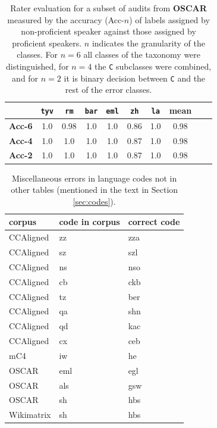 \begin{table}[!htbp]
    \centering
        \begin{tabular}{lccccccccc}
            \toprule
                           & \texttt{tyv} & \texttt{rm} & \texttt{bar} & \texttt{eml} & \texttt{zh} & \texttt{la} & \textbf{mean} \\
            \midrule
            \textbf{Acc-6} & 1.0          & 0.98        & 1.0          & 1.0          & 0.86        & 1.0         & 0.98          \\
            \textbf{Acc-4} & 1.0          & 1.0         & 1.0          & 1.0          & 0.87        & 1.0         & 0.98          \\
            \textbf{Acc-2} & 1.0          & 1.0         & 1.0          & 1.0          & 0.87        & 1.0         & 0.98          \\
            \bottomrule
        \end{tabular}%
    \caption{Rater evaluation for a subset of audits from \textbf{OSCAR} measured by the accuracy (Acc-$n$) of labels assigned by non-proficient speaker against those assigned by proficient speakers.  $n$ indicates the granularity of the classes. For $n=6$ all classes of the taxonomy were distinguished, for $n=4$ the \texttt{C} subclasses were combined, and for $n=2$ it is binary decision between \texttt{C} and the rest of the error classes.}
    \label{tab:agreement_oscar}
\end{table}


\begin{table}[!ht]
    \small
    \centering
    \begin{tabular}{lll}
        \toprule
        corpus     & code in corpus & correct code \\
        \hline
        CCAligned  & zz             & zza          \\
        CCAligned  & sz             & szl          \\
        CCAligned  & ns             & nso          \\
        CCAligned  & cb             & ckb          \\
        CCAligned  & tz             & ber          \\
        CCAligned  & qa             & shn          \\
        CCAligned  & qd             & kac          \\
        CCAligned  & cx             & ceb          \\
        mC4        & iw             & he           \\
        OSCAR      & eml            & egl          \\
        OSCAR      & als            & gsw          \\
        OSCAR      & sh             & hbs          \\
        Wikimatrix & sh             & hbs          \\
        \bottomrule
    \end{tabular}
    \caption{Miscellaneous errors in language codes not in other tables (mentioned in the text in Section \ref{sec:codes}).}
    \label{tab:misc_codes}
\end{table}


